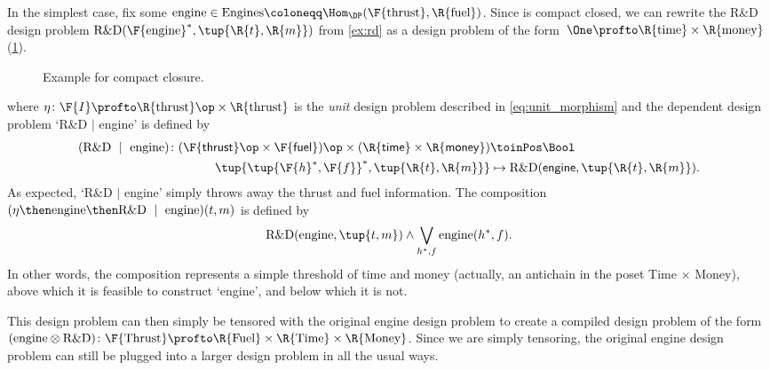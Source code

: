 \begin{example}
    \label{ex:rdproblem}
    In the simplest case, fix some $\text{engine} \in \text{Engines} \coloneqq \Hom_\DP(\F{\text{thrust}},\R{\text{fuel}})$. Since \DP is compact closed, we can rewrite the R\&D design problem $\text{R\&D}(\F{\text{engine}}^*, \tup{\R{t},\R{m}})$ from \cref{ex:rd} as a design problem of the form~$\One \profto \R{\text{time}} \times\R{\text{money}}$ (\cref{fig:excompactclosed}).
    \begin{figure}[h!]
        \begin{center}
        \end{center}
        \caption{Example for compact closure. \label{fig:excompactclosed}}
    \end{figure}
    where $\eta \colon \F{I} \profto \R{\text{thrust}}\op \times \R{\text{thrust}}$ is the \emph{unit} design problem described in \cref{eq:unit_morphism} and the dependent design problem `R\&D $\mid$ engine' is defined by
    \begin{equation}
        \begin{aligned}
        (\text{R\&D } \mid \text{ engine})
            \colon (\F{\mathsf{thrust}}\op \times \F{\mathsf{fuel}})\op \times (\R{\mathsf{time}} \times \R{\mathsf{money}}) &\toinPos \Bool \\
            \tup{\tup{\F{h}^*, \F{f}}^*, \tup{\R{t},\R{m}}} &\mapsto \text{R\&D}(\mathsf{engine}, \tup{\R{t},\R{m}}).
        \end{aligned}
    \end{equation}
    As expected, `R\&D $|$ engine' simply throws away the thrust and fuel information. The composition $(\eta \then \text{engine} \then \text{R\&D } \mid \text{ engine}) (t,m)$ is defined by
    \begin{equation}
        \text{R\&D}(\text{engine}, \tup{t,m}) \wedge \bigvee_{h^*,f} \text{engine}(h^*, f).
    \end{equation}
    In other words, the composition represents a simple threshold of time and money (actually, an antichain in the poset Time $\times$ Money), above which it is feasible to construct `engine', and below which it is not.

    This design problem can then simply be tensored with the original engine design problem to create a compiled design problem of the form $(\text{engine} \otimes \text{R\&D}) \colon \F{\text{Thrust}} \profto \R{\text{Fuel}} \times \R{\text{Time}} \times \R{\text{Money}}$. Since we are simply tensoring, the original engine design problem can still be plugged into a larger design problem in all the usual ways.
\end{example}

